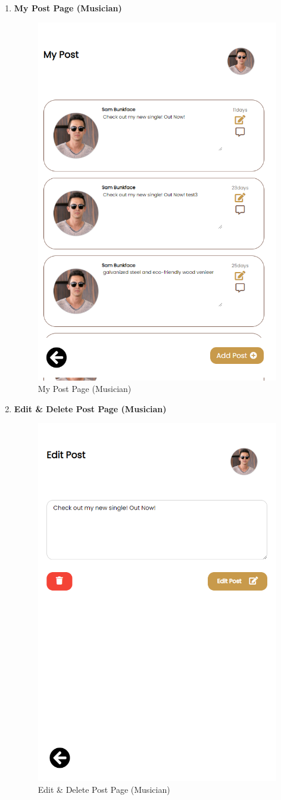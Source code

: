 \begin{enumerate}[1.]
    \item \textbf{My Post Page (Musician)}
    \begin{figure}[h]
        \centering
        \includegraphics[width=0.5\linewidth]{mainmatter/images/frontend/ss/My Post (Musician).png}
        \caption{My Post Page (Musician)}
        \label{fig:myfig59}
    \end{figure}

    \item \textbf{Edit \& Delete Post Page (Musician)}
    \begin{figure}[h]
        \centering
        \includegraphics[width=0.5\linewidth]{mainmatter/images/frontend/ss/Edit-Delete Post (Musician).png}
        \caption{Edit \& Delete Post Page (Musician)}
        \label{fig:myfig60}
    \end{figure}


\end{enumerate}
